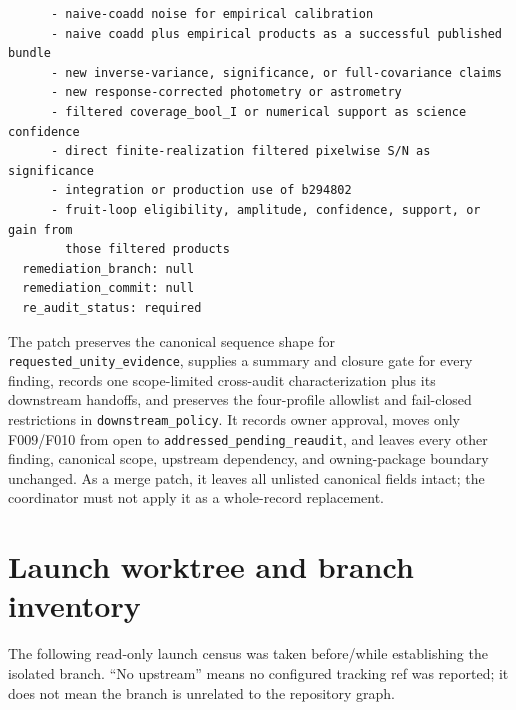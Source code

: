 \documentclass[11pt]{article}
\newcommand{\code}[1]{\nolinkurl{#1}}
\begin{document}
\begin{small}
\begin{verbatim}
      - naive-coadd noise for empirical calibration
      - naive coadd plus empirical products as a successful published bundle
      - new inverse-variance, significance, or full-covariance claims
      - new response-corrected photometry or astrometry
      - filtered coverage_bool_I or numerical support as science confidence
      - direct finite-realization filtered pixelwise S/N as significance
      - integration or production use of b294802
      - fruit-loop eligibility, amplitude, confidence, support, or gain from
        those filtered products
  remediation_branch: null
  remediation_commit: null
  re_audit_status: required
\end{verbatim}
\end{small}

The patch preserves the canonical sequence shape for
\code{requested_unity_evidence}, supplies a summary and closure gate for every
finding, records one scope-limited cross-audit characterization plus its
downstream handoffs, and preserves the four-profile allowlist and fail-closed
restrictions in \code{downstream_policy}.  It records owner approval, moves
only F009/F010 from open to \code{addressed_pending_reaudit}, and leaves every
other finding, canonical scope, upstream dependency, and owning-package
boundary unchanged.  As a merge patch, it leaves all unlisted canonical fields
intact; the coordinator must not apply it as a whole-record replacement.

\appendix
\section{Launch worktree and branch inventory}
\label{app:worktrees}

The following read-only launch census was taken before/while establishing the
isolated branch.  ``No upstream'' means no configured tracking ref was reported;
it does not mean the branch is unrelated to the repository graph.
\end{document}

